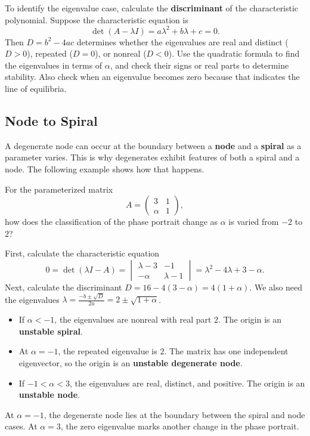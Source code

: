 \documentclass[11pt,letterpaper]{article}
\begin{document}
To identify the eigenvalue case, calculate the \textbf{discriminant} of the characteristic polynomial. Suppose the characteristic equation is
\[
\det(A-\lambda I)=a\lambda^2+b\lambda+c=0.
\]
Then $D=b^2-4ac$ determines whether the eigenvalues are real and distinct ($D>0$), repeated ($D=0$), or nonreal ($D<0$). Use the quadratic formula to find the eigenvalues in terms of $\alpha$, and check their signs or real parts to determine stability. Also check when an eigenvalue becomes zero because that indicates the line of equilibria.

\subsection{Node to Spiral}
A degenerate node can occur at the boundary between a \textbf{node} and a \textbf{spiral} as a parameter varies. 
This is why degenerates exhibit features of both a spiral and a node. The following example shows how that happens.

\begin{example}[6]{
For the parameterized matrix
\[
A=\begin{pmatrix}3&1\\\alpha&1\end{pmatrix},
\]
how does the classification of the phase portrait change as $\alpha$ is varied from $-2$ to $2$?

}
First, calculate the characteristic equation 
\[
0=\det(\lambda I-A)=
\begin{vmatrix}\lambda-3&-1\\-\alpha&\lambda-1\end{vmatrix}
=\lambda^2-4\lambda+3-\alpha.
\]
Next, calculate the discriminant $D=16-4(3-\alpha)=4(1+\alpha).$
We also need the eigenvalues $\lambda = \frac{-b\pm\sqrt{D}}{2a} = 2\pm\sqrt{1+\alpha}$.
\begin{itemize}
\item If $\alpha<-1$, the eigenvalues are nonreal with real part $2$. The origin is an \textbf{unstable spiral}.
\item At $\alpha=-1$, the repeated eigenvalue is $2$. The matrix has one independent eigenvector, so the origin is an \textbf{unstable degenerate node}.
\item If $-1<\alpha<3$, the eigenvalues are real, distinct, and positive. The origin is an \textbf{unstable node}.
\end{itemize}
At $\alpha=-1$, the degenerate node lies at the boundary between the spiral and node cases. At $\alpha=3$, the zero eigenvalue marks another change in the phase portrait.

\end{example}
\end{document}

